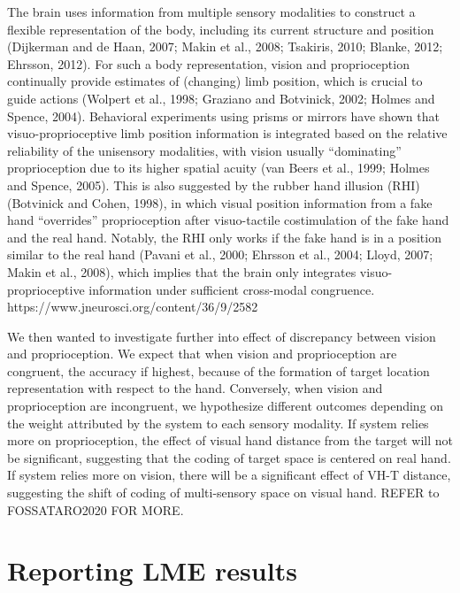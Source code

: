 The brain uses information from multiple sensory modalities to construct a flexible representation of the body, including its current structure and position (Dijkerman and de Haan, 2007; Makin et al., 2008; Tsakiris, 2010; Blanke, 2012; Ehrsson, 2012). For such a body representation, vision and proprioception continually provide estimates of (changing) limb position, which is crucial to guide actions (Wolpert et al., 1998; Graziano and Botvinick, 2002; Holmes and Spence, 2004). Behavioral experiments using prisms or mirrors have shown that visuo-proprioceptive limb position information is integrated based on the relative reliability of the unisensory modalities, with vision usually “dominating” proprioception due to its higher spatial acuity (van Beers et al., 1999; Holmes and Spence, 2005). This is also suggested by the rubber hand illusion (RHI) (Botvinick and Cohen, 1998), in which visual position information from a fake hand “overrides” proprioception after visuo-tactile costimulation of the fake hand and the real hand. Notably, the RHI only works if the fake hand is in a position similar to the real hand (Pavani et al., 2000; Ehrsson et al., 2004; Lloyd, 2007; Makin et al., 2008), which implies that the brain only integrates visuo-proprioceptive information under sufficient cross-modal congruence.
https://www.jneurosci.org/content/36/9/2582 















We then wanted to investigate further into effect of discrepancy between vision and proprioception. We expect that when vision and proprioception are congruent, the accuracy if highest, because of the formation of target location representation with respect to the hand. Conversely, when vision and proprioception are incongruent, we hypothesize different outcomes depending on the weight attributed by the system to each sensory modality. \cite{fossataro2020immersive} If system relies more on proprioception, the effect of visual hand distance from the target will not be significant, suggesting that the coding of target space is centered on real hand. If system relies more on vision, there will be a significant effect of VH-T distance, suggesting the shift of coding of multi-sensory space on visual hand. REFER to FOSSATARO2020 FOR MORE.
\section{Reporting LME results}

